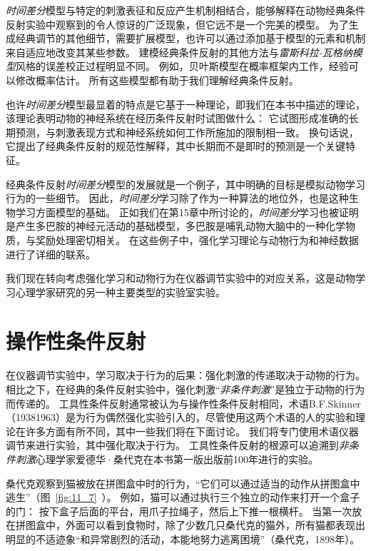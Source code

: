 {\textit{时间差分}模型与特定的刺激表征和反应产生机制相结合，能够解释在动物经典条件反射实验中观察到的令人惊讶的广泛现象，但它远不是一个完美的模型。
为了生成经典调节的其他细节，需要扩展模型，也许可以通过添加基于模型的元素和机制来自适应地改变其某些参数。
建模经典条件反射的其他方法与\textit{雷斯科拉-瓦格纳模型}风格的误差校正过程明显不同。
例如，贝叶斯模型在概率框架内工作，经验可以修改概率估计。
所有这些模型都有助于我们理解经典条件反射。


也许\textit{时间差分}模型最显着的特点是它基于一种理论，即我们在本书中描述的理论，该理论表明动物的神经系统在经历条件反射时试图做什么：
它试图形成准确的长期预测，与刺激表现方式和神经系统如何工作所施加的限制相一致。
换句话说，它提出了经典条件反射的规范性解释，其中长期而不是即时的预测是一个关键特征。


经典条件反射\textit{时间差分}模型的发展就是一个例子，其中明确的目标是模拟动物学习行为的一些细节。
因此，\textit{时间差分}学习除了作为一种算法的地位外，也是这种生物学习方面模型的基础。
正如我们在第15章中所讨论的，\textit{时间差分}学习也被证明是产生多巴胺的神经元活动的基础模型，多巴胺是哺乳动物大脑中的一种化学物质，与奖励处理密切相关。
在这些例子中，强化学习理论与动物行为和神经数据进行了详细的联系。


我们现在转向考虑强化学习和动物行为在仪器调节实验中的对应关系，这是动物学习心理学家研究的另一种主要类型的实验室实验。


\section{操作性条件反射} \label{sec:instrumental_conditioning}

在仪器调节实验中，学习取决于行为的后果：强化刺激的传递取决于动物的行为。
相比之下，在经典的条件反射实验中，强化刺激“\textit{非条件刺激}”是独立于动物的行为而传递的。
工具性条件反射通常被认为与操作性条件反射相同，术语B.F.Skinner（19381963）是为行为偶然强化实验引入的，尽管使用这两个术语的人的实验和理论在许多方面有所不同，其中一些我们将在下面讨论。
我们将专门使用术语仪器调节来进行实验，其中强化取决于行为。
工具性条件反射的根源可以追溯到\textit{非条件刺激}心理学家爱德华·桑代克在本书第一版出版前100年进行的实验。


桑代克观察到猫被放在拼图盒中时的行为，“它们可以通过适当的动作从拼图盒中逃生”（图~\ref{fig:11_7}~）。
例如，猫可以通过执行三个独立的动作来打开一个盒子的门：
按下盒子后面的平台，用爪子拉绳子，然后上下推一根横杆。
当第一次放在拼图盒中，外面可以看到食物时，除了少数几只桑代克的猫外，所有猫都表现出明显的不适迹象“和异常剧烈的活动，本能地努力逃离困境”（桑代克，1898年）。


}
